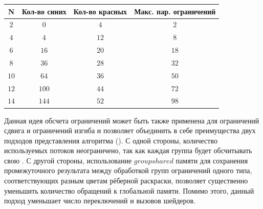 		\noindent %
	\begin{minipage}{\textwidth}
		\vspace{\mfloatsep} %
		\centering\small
		\label{tab:chunkSize}
		\begin{tabular}{|c|c|c|c|}
			\hline
			\textbf{N} & \textbf{Кол-во синих} & \textbf{Кол-во красных} & \textbf{Макс. пар. ограничений}\\
			\hline
				$2$ & $0$ & $4$ & $2$\\ \hline
				$4$ & $4$ & $12$ & $8$\\ \hline
				$6$ & $16$ & $20$ & $18$\\ \hline
				$8$ & $36$ & $28$ & $32$\\ \hline
				$10$ & $64$ & $36$ & $50$\\ \hline
				$12$ & $100$ & $44$ & $72$\\ \hline
				$14$ & $144$ & $52$ & $98$\\ \hline
			
		\end{tabular}
		\vspace{\mfloatsep} %
		\normalsize %
	\end{minipage}
	
	Данная идея обсчета ограничений  может быть также применена для ограничений сдвига и ограничений изгиба и позволяет объединить в себе преимущества двух подходов представления алгоритма (). С одной стороны, количество используемых потоков неограничено, так как каждая группа будет обсчитывать свою . С другой стороны, использование $groupshared$ памяти для сохранения промежуточного результата между обработкой групп ограничений одного типа, соответствующих разным цветам рёберной раскраски, позволяет существенно уменьшить количество обращений к глобальной памяти. Помимо этого, данный подход уменьшает число переключений и вызовов шейдеров.


%
